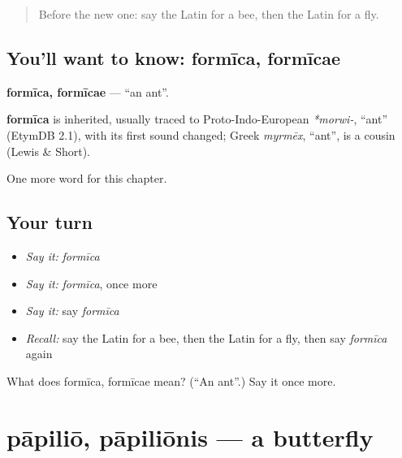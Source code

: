\label{lesson:LA-C132-formica}



\begin{quote}
Before the new one: say the Latin for a bee, then the Latin for a fly.
\end{quote}

\subsection*{You'll want to know: formīca, formīcae}
\textbf{formīca, formīcae} — \textquotedblleft{}an ant\textquotedblright{}.

\begin{cousinweb}
\textbf{formīca} is inherited, usually traced to Proto-Indo-European \emph{*morwi-}, \textquotedblleft{}ant\textquotedblright{} (EtymDB 2.1), with its first sound changed; Greek \emph{myrmēx}, \textquotedblleft{}ant\textquotedblright{}, is a cousin (Lewis \& Short).
\end{cousinweb}

\begin{grammarlens}[title={What you've built}]
One more word for this chapter.
\end{grammarlens}

\subsection*{Your turn}
\begin{itemize}
\raggedright
  \item \emph{Say it:} \emph{formīca}
  \item \emph{Say it:} \emph{formīca}, once more
  \item \emph{Say it:} say \emph{formīca}
  \item \emph{Recall:} say the Latin for a bee, then the Latin for a fly, then say \emph{formīca} again
\end{itemize}

\begin{tcolorbox}[breakable,colback=teal!4,colframe=teal!35!black,title={Before you move on}]
What does formīca, formīcae mean? (\textquotedblleft{}An ant\textquotedblright{}.) Say it once more.
\end{tcolorbox}
\section[pāpiliō, pāpiliōnis]{pāpiliō, pāpiliōnis — a butterfly}

